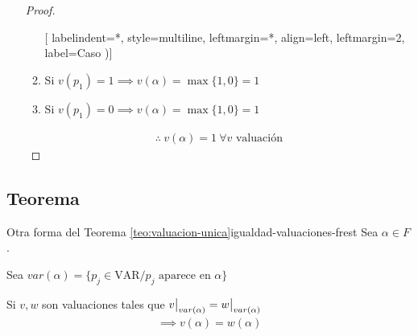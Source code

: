 \begin{enumerate}
\begin{proof}
            \begin{enumerate}[%
                            labelindent=*,
                            style=multiline,
                            leftmargin=*,
                            align=left,
                            leftmargin=2\parindent,
                            label=Caso \arabic*)]
                \item Si $v(p_1) = 1 \implies v(\alpha) = \max{\{ 1,0 \}}=1$
                \item Si $v(p_1) = 0 \implies v(\alpha) = \max{\{ 1,0 \}}=1$
            \end{enumerate}
            \begin{gather*}
                \therefore ~  v(\alpha) = 1 ~ \forall v \text{ valuación}
            \end{gather*}
        \end{proof}
\end{enumerate} 


\subsection{Teorema}

\begin{teorema}{Otra forma del Teorema \ref{teo:valuacion-unica}}{igualdad-valuaciones-frest}
    Sea $\alpha \in F$. 

    Sea $var(\alpha) = 
    \{ p_j \in \mathrm{VAR} / p_j \text{ aparece en } \alpha \}$

    \medskip

    Si $v, w$ son valuaciones tales que 
    $\frest{v}{var(\alpha)} = \frest{w}{var(\alpha)}$
    \begin{gather*}
        \implies v(\alpha) = w(\alpha)
    \end{gather*}

\end{teorema}

